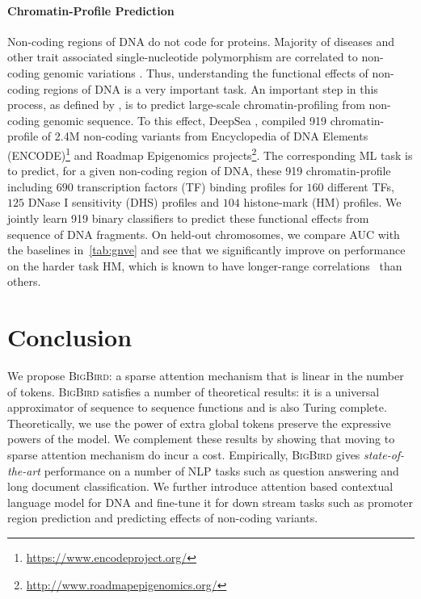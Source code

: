\paragraph{Chromatin-Profile Prediction} Non-coding regions of DNA do not code for proteins. Majority of diseases and other trait associated single-nucleotide polymorphism are correlated to non-coding genomic variations \citep{zhou2015predicting, khurana2016role}. Thus, understanding the functional effects of non-coding regions of DNA is a very important task. An important step in this process, as defined by \citet{zhou2015predicting}, is to predict large-scale chromatin-profiling from non-coding genomic sequence. To this effect, DeepSea \citep{zhou2015predicting}, compiled 919 chromatin-profile of 2.4M non-coding variants from Encyclopedia of DNA Elements (ENCODE)\footnote{\url{https://www.encodeproject.org/}} and Roadmap Epigenomics projects\footnote{\url{http://www.roadmapepigenomics.org/}}. 
The corresponding ML task is to predict, for a given non-coding region of DNA, these 919 chromatin-profile including $690$ transcription factors (TF) binding profiles for $160$ different TFs, $125$ DNase I sensitivity (DHS) profiles and $104$ histone-mark (HM) profiles. We jointly learn 919 binary classifiers to predict these functional effects from sequence of DNA fragments. On held-out chromosomes, we compare AUC with the baselines in~\ref{tab:gnve} and see that we significantly improve on  performance on the harder task HM, which is known to have longer-range correlations~\citep{gates2017histone} than others.

\section{Conclusion}
We propose \textsc{BigBird}: a sparse attention mechanism that is linear in the number of tokens. \textsc{BigBird} satisfies a number of theoretical results: it is a universal approximator of sequence to sequence functions and is also Turing complete.  Theoretically,  we use the power of extra global tokens preserve the expressive powers of the model. We complement these results by showing that moving to sparse attention mechanism do incur a cost. Empirically, \textsc{BigBird}  gives  \emph{state-of-the-art} performance on a number of NLP tasks such as question answering and long document classification. We  further introduce attention based contextual language model for DNA and fine-tune it for down stream tasks such as  promoter region prediction and predicting effects of non-coding variants.


